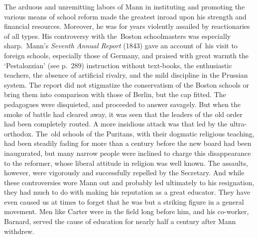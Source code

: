 \documentclass[]{book}
\begin{document}
The arduous and unremitting labors of Mann in instituting and promoting the various means of school reform made the greatest inroad upon his strength and financial resources. Moreover, he was for years violently assailed by reactionaries of all types. His controversy with the~Boston schoolmasters was especially sharp.~Mann's \emph{Seventh Annual Report} (1843) gave an account of~his visit to foreign schools, especially those of Germany, and praised with great warmth the `Pestalozzian' (see p.~289) instruction without text-books, the enthusiastic teachers, the absence of artificial rivalry, and the mild discipline in the Prussian system. The report did not stigmatize the conservatism of the Boston schools or bring them into comparison with those of Berlin, but the cap fitted. The pedagogues were disquieted, and proceeded to answer savagely. But when the smoke of battle had cleared away, it was seen that the leaders of the old order had been completely routed. A more insidious attack was that led by the ultra-orthodox. The~old schools of the Puritans, with their dogmatic religious teaching, had been steadily fading for more than a century before the new board had been inaugurated, but many narrow people were inclined to charge this disappearance to the reformer, whose liberal attitude in religion was well known. The assaults, however, were vigorously and successfully repelled by the Secretary. And while these controversies wore Mann out and probably led ultimately to his resignation, they had much to do with making his reputation as a great educator. They have even caused us at times to forget that he was but a striking figure in a general movement. Men like Carter were in the field long before him, and his co-worker, Barnard, served the cause of education for nearly half a century after Mann withdrew.
\end{document}
